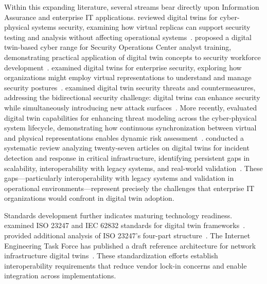 Within this expanding literature, several streams bear directly upon Information Assurance and enterprise IT applications. \citeauthor{Eckhart_Ekelhart_2019} reviewed digital twins for cyber-physical systems security, examining how virtual replicas can support security testing and analysis without affecting operational systems~\parencite{Eckhart_Ekelhart_2019}. \citeauthor{Vielberth_2021} proposed a digital twin-based cyber range for Security Operations Center analyst training, demonstrating practical application of digital twin concepts to security workforce development~\parencite{Vielberth_2021}. \citeauthor{Dietz_Pernul_2020} examined digital twins for enterprise security, exploring how organizations might employ virtual representations to understand and manage security postures~\parencite{Dietz_Pernul_2020}. \citeauthor{Karaarslan_Babiker_2021} examined digital twin security threats and countermeasures, addressing the bidirectional security challenge: digital twins can enhance security while simultaneously introducing new attack surfaces~\parencite{Karaarslan_Babiker_2021}. More recently, \citeauthor{Erceylan_2025} evaluated digital twin capabilities for enhancing threat modeling across the cyber-physical system lifecycle, demonstrating how continuous synchronization between virtual and physical representations enables dynamic risk assessment~\parencite{Erceylan_2025}. \citeauthor{Kampourakis_2025} conducted a systematic review analyzing twenty-seven articles on digital twins for incident detection and response in critical infrastructure, identifying persistent gaps in scalability, interoperability with legacy systems, and real-world validation~\parencite{Kampourakis_2025}. These gaps---particularly interoperability with legacy systems and validation in operational environments---represent precisely the challenges that enterprise IT organizations would confront in digital twin adoption.

Standards development further indicates maturing technology readiness. \citeauthor{Shao_2021} examined ISO 23247 and IEC 62832 standards for digital twin frameworks~\parencite{Shao_2021}. \citeauthor{Shao_ISO_23247_2023} provided additional analysis of ISO 23247's four-part structure~\parencite{Shao_ISO_23247_2023}. The Internet Engineering Task Force has published a draft reference architecture for network infrastructure digital twins~\parencite{IETF_NDT_2024}. These standardization efforts establish interoperability requirements that reduce vendor lock-in concerns and enable integration across implementations.


